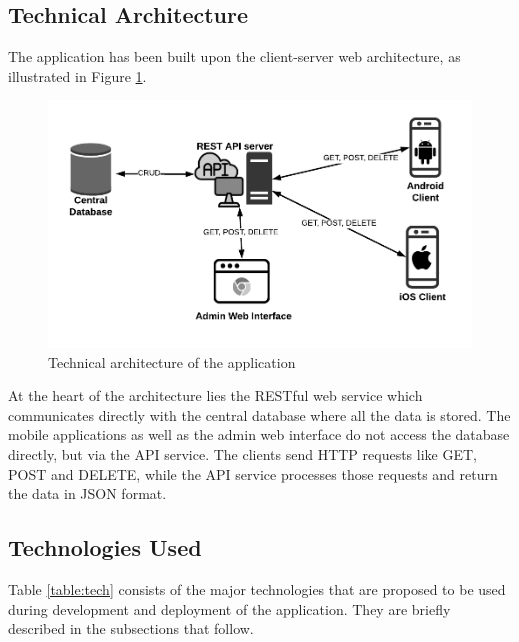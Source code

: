 \documentclass[12pt, a4paper, oneside]{article}
\begin{document}
\subsection{Technical Architecture}
The application has been built upon the client-server web architecture, as illustrated in Figure \ref{fig:arch}.

\begin{figure}[H]
\includegraphics[width=\linewidth]{architecture}
\centering
\caption{Technical architecture of the application}
\label{fig:arch}
\end{figure}

At the heart of the architecture lies the RESTful web service which communicates directly with the central database where all the data is stored. The mobile applications as well as the admin web interface do not access the database directly, but via the API service. The clients send HTTP requests like GET, POST and DELETE, while the API service processes those requests and return the data in JSON format.

\subsection{Technologies Used}
Table \ref{table:tech} consists of the major technologies that are proposed to be used during development and deployment of the application. They are briefly described in the subsections that follow.
\end{document}
